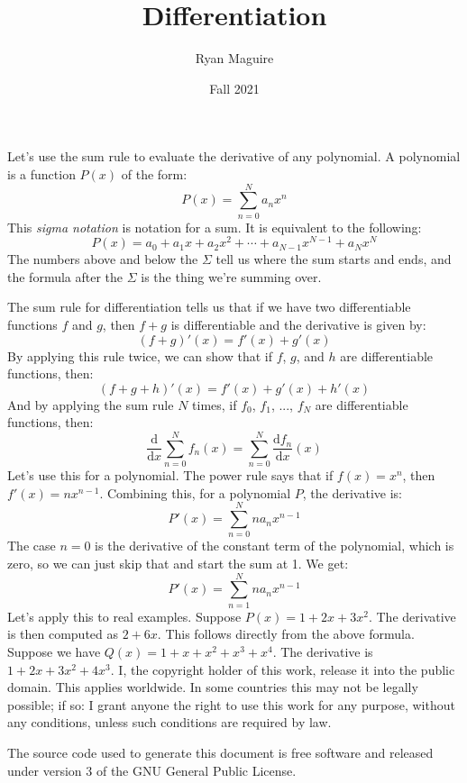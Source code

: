 \documentclass{article}
\title{Differentiation}
\author{Ryan Maguire}
\date{Fall 2021}
\theoremstyle{normal}
\theoremstyle{plain}
\begin{document}
    \maketitle
    Let's use the sum rule to evaluate the derivative of any polynomial. A
    polynomial is a function $P(x)$ of the form:
    \begin{equation}
        P(x)=\sum_{n=0}^{N}a_{n}x^{n}
    \end{equation}
    This \textit{sigma notation} is notation for a sum. It is equivalent to the
    following:
    \begin{equation}
        P(x)=a_{0}+a_{1}x+a_{2}x^{2}+\cdots+a_{N-1}x^{N-1}+a_{N}x^{N}
    \end{equation}
    The numbers above and below the $\Sigma$ tell us where the sum starts and
    ends, and the formula after the $\Sigma$ is the thing we're summing over.
    \par\hfill\par
    The sum rule for differentiation tells us that if we have two
    differentiable functions $f$ and $g$, then $f+g$ is differentiable and the
    derivative is given by:
    \begin{equation}
        (f+g)'(x)=f'(x)+g'(x)
    \end{equation}
    By applying this rule twice, we can show that if $f$, $g$, and $h$ are
    differentiable functions, then:
    \begin{equation}
        (f+g+h)'(x)=f'(x)+g'(x)+h'(x)
    \end{equation}
    And by applying the sum rule $N$ times, if $f_{0}$, $f_{1}$, ...,
    $f_{N}$ are differentiable functions, then:
    \begin{equation}
        \frac{\textrm{d}}{\textrm{d}x}\sum_{n=0}^{N}f_{n}(x)
        =\sum_{n=0}^{N}\frac{\textrm{d}f_{n}}{\textrm{d}x}(x)
    \end{equation}
    Let's use this for a polynomial. The power rule says that if
    $f(x)=x^{n}$, then $f'(x)=nx^{n-1}$. Combining this, for a polynomial
    $P$, the derivative is:
    \begin{equation}
        P'(x)=\sum_{n=0}^{N}na_{n}x^{n-1}
    \end{equation}
    The case $n=0$ is the derivative of the constant term of the polynomial,
    which is zero, so we can just skip that and start the sum at 1. We get:
    \begin{equation}
        P'(x)=\sum_{n=1}^{N}na_{n}x^{n-1}
    \end{equation}
    Let's apply this to real examples. Suppose $P(x)=1+2x+3x^{2}$. The
    derivative is then computed as $2+6x$. This follows directly from the
    above formula. Suppose we have $Q(x)=1+x+x^{2}+x^{3}+x^{4}$. The derivative
    is $1+2x+3x^{2}+4x^{3}$.
    \newpage
    I, the copyright holder of this work, release it into the public domain.
    This applies worldwide. In some countries this may not be legally possible;
    if so: I grant anyone the right to use this work for any purpose, without
    any conditions, unless such conditions are required by law.
    \par\hfill\par
    The source code used to generate this document is free software and released
    under version 3 of the GNU General Public License.
\end{document}
